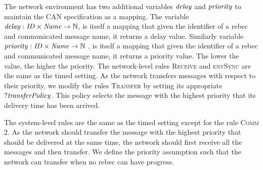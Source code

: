 The network environment has two additional variables $\mathit{delay}$ and $\mathit{priority}$ to maintain the CAN specification as a mapping. The variable $\mathit{delay}:\mathit{ID}\times\mathit{Name}\rightarrow \mathbb{N}$, is itself a mapping that given the identifier of a rebec and communicated message name, it returns a delay value. Similarly variable $\mathit{priority}:\mathit{ID}\times\mathit{Name}\rightarrow \mathbb{N}$ , is itself a mapping that given the identifier of a rebec and communicated message name, it returns a priority value. The lower the value, the higher the priority. The network-level rules \textsc{Receive} and \textsc{envSync}  are the same as the timed setting. As the network transfers messages with respect to their priority, we modify the rules \textsc{Transfer} by setting its appropriate $?{\it transferPolicy}$.  This policy selects the message with the highest priority that its delivery time has been arrived.


The system-level rules are the same as the timed setting except for the rule \textsc{Comm 2}. As the network should transfer the message with the highest priority that should be delivered at the same time, the network should first receive all the messages and then transfer. We define the priority assumption such that the network can transfer when no rebec can have progress.  
